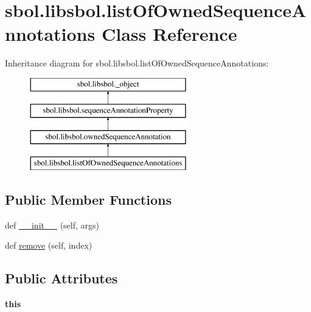 \hypertarget{classsbol_1_1libsbol_1_1list_of_owned_sequence_annotations}{}\section{sbol.\+libsbol.\+list\+Of\+Owned\+Sequence\+Annotations Class Reference}
\label{classsbol_1_1libsbol_1_1list_of_owned_sequence_annotations}
Inheritance diagram for sbol.\+libsbol.\+list\+Of\+Owned\+Sequence\+Annotations\+:\begin{figure}[H]
\begin{center}
\leavevmode
\includegraphics[height=4.000000cm]{classsbol_1_1libsbol_1_1list_of_owned_sequence_annotations}
\end{center}
\end{figure}
\subsection*{Public Member Functions}
\begin{DoxyCompactItemize}
\item 
def \hyperlink{classsbol_1_1libsbol_1_1list_of_owned_sequence_annotations_a3bfb2f31c1ff6bdeb9720b13fe490091}{\+\_\+\+\_\+init\+\_\+\+\_\+} (self, args)
\item 
def \hyperlink{classsbol_1_1libsbol_1_1list_of_owned_sequence_annotations_aa524379a36a95b187401a53e7caa2e8e}{remove} (self, index)
\end{DoxyCompactItemize}
\subsection*{Public Attributes}
\begin{DoxyCompactItemize}
\item 
{\bfseries this}\hypertarget{classsbol_1_1libsbol_1_1list_of_owned_sequence_annotations_aaad5cdee7f9eaaaed2dff21fd4b86523}{}\label{classsbol_1_1libsbol_1_1list_of_owned_sequence_annotations_aaad5cdee7f9eaaaed2dff21fd4b86523}

\end{DoxyCompactItemize}
